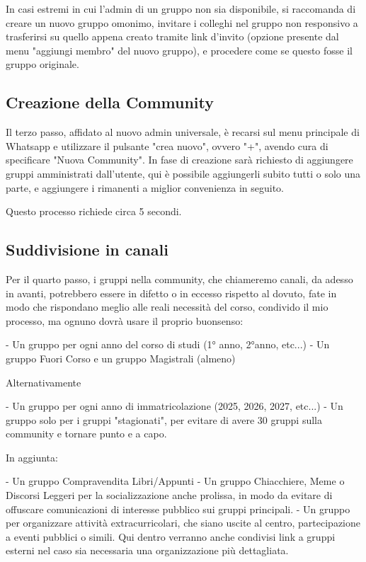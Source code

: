 \documentclass{article}
\begin{document}
In casi estremi in cui l'admin di un gruppo non sia disponibile, si raccomanda di creare un nuovo gruppo omonimo, invitare i colleghi nel gruppo non responsivo a trasferirsi su quello appena creato tramite link d'invito (opzione presente dal menu "aggiungi membro" del nuovo gruppo), e procedere come se questo fosse il gruppo originale.

\subsection{Creazione della Community}
Il terzo passo, affidato al nuovo admin universale, è recarsi sul menu principale di Whatsapp e utilizzare il pulsante "crea nuovo", ovvero "+", avendo cura di specificare "Nuova Community". In fase di creazione sarà richiesto di aggiungere gruppi amministrati dall'utente, qui è possibile aggiungerli subito tutti o solo una parte, e aggiungere i rimanenti a miglior convenienza in seguito.

Questo processo richiede circa 5 secondi.

\subsection{Suddivisione in canali}
Per il quarto passo, i gruppi nella community, che chiameremo canali, da adesso in avanti, potrebbero essere in difetto o in eccesso rispetto al dovuto, fate in modo che rispondano meglio alle reali necessità del corso, condivido il mio processo, ma ognuno dovrà usare il proprio buonsenso:

- Un gruppo per ogni anno del corso di studi (1° anno, 2°anno, etc...)
- Un gruppo Fuori Corso e un gruppo Magistrali (almeno)

Alternativamente

- Un gruppo per ogni anno di immatricolazione (2025, 2026, 2027, etc...)
- Un gruppo solo per i gruppi "stagionati", per evitare di avere 30 gruppi sulla community e tornare punto e a capo.

In aggiunta:

- Un gruppo Compravendita Libri/Appunti
- Un gruppo Chiacchiere, Meme o Discorsi Leggeri per la socializzazione anche prolissa, in modo da evitare di offuscare comunicazioni di interesse pubblico sui gruppi principali.
- Un gruppo per organizzare attività extracurricolari, che siano uscite al centro, partecipazione a eventi pubblici o simili. Qui dentro verranno anche condivisi link a gruppi esterni nel caso sia necessaria una organizzazione più dettagliata.
\end{document}
